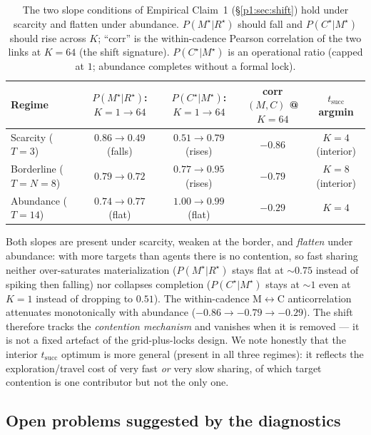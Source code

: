 \documentclass{article}
\begin{document}
\begin{table}[h]
\caption{The two slope conditions of Empirical Claim~1 (\S\ref{p1:sec:shift}) hold under scarcity and flatten under abundance. $P(M^\star|R^\star)$ should fall and $P(C^\star|M^\star)$ should rise across $K$; ``corr'' is the within-cadence Pearson correlation of the two links at $K{=}64$ (the shift signature). $P(C^\star|M^\star)$ is an operational ratio (capped at $1$; abundance completes without a formal lock).}
\label{p1:tab:cadence-robustness}
\centering
\small
\begin{tabular}{l c c c c}
\toprule
Regime & $P(M^\star|R^\star)$: $K{=}1\!\to\!64$ & $P(C^\star|M^\star)$: $K{=}1\!\to\!64$ & corr$(M,C)$ @ $K{=}64$ & $t_{\mathrm{succ}}$ argmin \\
\midrule
Scarcity ($T{=}3$)      & $0.86 \to 0.49$ (falls) & $0.51 \to 0.79$ (rises) & $-0.86$ & $K{=}4$ (interior) \\
Borderline ($T{=}N{=}8$) & $0.79 \to 0.72$        & $0.77 \to 0.95$ (rises) & $-0.79$ & $K{=}8$ (interior) \\
Abundance ($T{=}14$)    & $0.74 \to 0.77$ (flat)  & $1.00 \to 0.99$ (flat)  & $-0.29$ & $K{=}4$ \\
\bottomrule
\end{tabular}
\end{table}

Both slopes are present under scarcity, weaken at the border, and \emph{flatten}
under abundance: with more targets than agents there is no contention, so fast
sharing neither over-saturates materialization ($P(M^\star|R^\star)$ stays flat
at $\sim0.75$ instead of spiking then falling) nor collapses completion
($P(C^\star|M^\star)$ stays at $\sim1$ even at $K{=}1$ instead of dropping to
$0.51$). The within-cadence M$\leftrightarrow$C anticorrelation attenuates
monotonically with abundance ($-0.86\to-0.79\to-0.29$). The shift therefore
tracks the \emph{contention mechanism} and vanishes when it is removed --- it is
not a fixed artefact of the grid-plus-locks design. We note honestly that the
interior $t_{\mathrm{succ}}$ optimum is more general (present in all three
regimes): it reflects the exploration/travel cost of very fast \emph{or} very
slow sharing, of which target contention is one contributor but not the only
one.

\subsection{Open problems suggested by the diagnostics}
\label{p1:app:open-problems}
\end{document}
